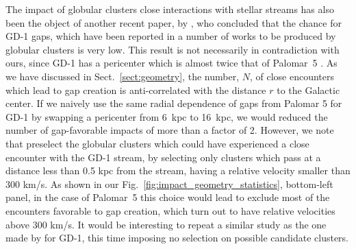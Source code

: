 \documentclass[draft]{aa}
\begin{document}
  The impact of globular clusters close interactions with stellar streams has also been the object of another recent paper, by \citet{2022ApJ...941..129D}, who concluded that the chance for GD-1 gaps, which have been reported in a number of works \citep[see, for example, ][]{2019ApJ...880...38B,2018MNRAS.477.1893D,2020AAS...23533607D} to be produced by globular clusters is very low. This result is not necessarily in contradiction with ours, since GD-1 has a pericenter which is almost twice that of Palomar~5 \citep[see, for example][]{2019MNRAS.486.2995M}. As we have discussed in Sect.~\ref{sect:geometry}, the number, $N$, of close encounters which lead to gap creation is anti-correlated with the distance $r$ to the Galactic center. If we naively use the same radial dependence of gaps from Palomar 5 for GD-1 by swapping a pericenter from 6~kpc to 16~kpc, we would reduced the number of gap-favorable impacts of more than a factor of 2. However, we note that \citet{2022ApJ...941..129D} preselect the globular clusters which could have experienced a close encounter with the GD-1 stream, by selecting only clusters which pass at a distance less than 0.5 kpc from the stream, having a relative velocity smaller than  300 km/s. As shown in our Fig.~\ref{fig:impact_geometry_statistics}, bottom-left panel, in the case of Palomar~5 this choice would lead to exclude most of the encounters favorable to gap creation, which turn out to have relative velocities above 300 km/s. It would be interesting to repeat a similar study as the one made by \citet{2022ApJ...941..129D} for GD-1, this time imposing no selection on possible candidate clusters.\\
  
\end{document}
